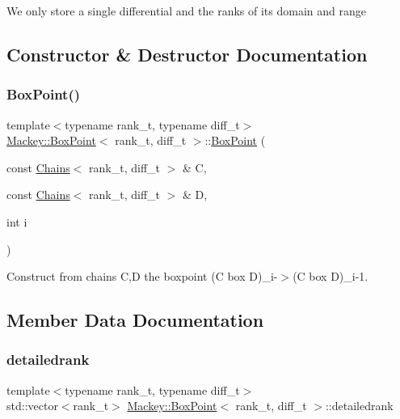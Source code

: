 We only store a single differential and the ranks of its domain and range 

\subsection{Constructor \& Destructor Documentation}
\mbox{\label{classMackey_1_1BoxPoint_a7d7864d6623adb228897cb2d42594900}} 
\subsubsection{\texorpdfstring{Box\+Point()}{BoxPoint()}}
{\footnotesize\ttfamily template$<$typename rank\+\_\+t, typename diff\+\_\+t$>$ \\
\hyperlink{classMackey_1_1BoxPoint}{Mackey\+::\+Box\+Point}$<$ rank\+\_\+t, diff\+\_\+t $>$\+::\hyperlink{classMackey_1_1BoxPoint}{Box\+Point} (\begin{DoxyParamCaption}\item[{const \hyperlink{classMackey_1_1Chains}{Chains}$<$ rank\+\_\+t, diff\+\_\+t $>$ \&}]{C,  }\item[{const \hyperlink{classMackey_1_1Chains}{Chains}$<$ rank\+\_\+t, diff\+\_\+t $>$ \&}]{D,  }\item[{int}]{i }\end{DoxyParamCaption})\hspace{0.3cm}{\ttfamily [inline]}}



Construct from chains C,D the boxpoint (C box D)\+\_\+i-\/$>$(C box D)\+\_\+i-\/1. 



\subsection{Member Data Documentation}
\mbox{\label{classMackey_1_1BoxPoint_a5a8fb888221c014f19fe2f9a8d4b2fa3}} 
\subsubsection{\texorpdfstring{detailedrank}{detailedrank}}
{\footnotesize\ttfamily template$<$typename rank\+\_\+t, typename diff\+\_\+t$>$ \\
std\+::vector$<$rank\+\_\+t$>$ \hyperlink{classMackey_1_1BoxPoint}{Mackey\+::\+Box\+Point}$<$ rank\+\_\+t, diff\+\_\+t $>$\+::detailedrank}



